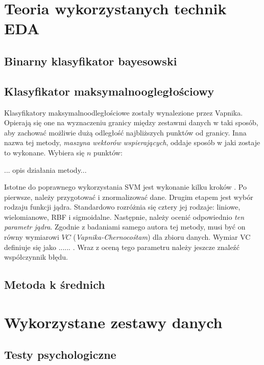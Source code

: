 \documentclass[12pt,a4paper,oneside]{report} %
\begin{document}
\chapter{Teoria wykorzystanych technik EDA}

\section{Binarny klasyfikator bayesowski}




\section{Klasyfikator maksymalnoogległościowy}
Klasyfikatory maksymalnoodległościowe zostały wynalezione przez Vapnika. Opierają się one na wyznaczeniu granicy między zestawmi danych w taki sposób, aby zachować możliwie dużą odległość najbliższych punktów od granicy. Inna nazwa tej metody, \emph{maszyna wektorów wspierających}, oddaje sposób w jaki zostaje to wykonane. Wybiera się $n$ punktów:\par
    ... opis działania metody...\par
Istotne do poprawnego wykorzystania SVM jest wykonanie kilku kroków \cite{chih-wei}. Po pierwsze, należy przygotować i znormalizować dane. Drugim etapem jest wybór rodzaju funkcji jądra. Standardowo rozróżnia się cztery jej rodzaje: liniowe, wielomianowe, RBF i sigmoidalne. Następnie, należy ocenić odpowiednio \emph{ten parametr jądra}. Zgodnie z badaniami samego autora tej metody, musi być on równy wymiarowi $VC$ (\emph{Vapnika-Chernocośtam}) dla zbioru danych. Wymiar VC definiuje się jako ...... . Wraz z oceną tego parametru należy jeszcze znaleźć współczynnik błędu. \par
\section{Metoda k średnich}






\chapter{Wykorzystane zestawy danych}

\section{Testy psychologiczne}
\end{document}
